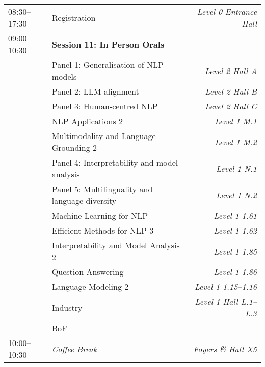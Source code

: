 \begin{xltabular}{\linewidth}{l X r}
    08:30--17:30    &   Registration    &   \textit{Level 0 Entrance Hall} \\
    09:00--10:30    &   \textbf{Session 11: In Person Orals} & \\
    &   Panel 1: Generalisation of NLP models   &   \textit{Level 2 Hall A} \\
    &   Panel 2: LLM alignment  &   \textit{Level 2 Hall B} \\
    &   Panel 3: Human-centred NLP  &   \textit{Level 2 Hall C} \\
    &   NLP Applications 2  &   \textit{Level 1 M.1} \\
    &   Multimodality and Language Grounding 2 &   \textit{Level 1 M.2} \\
    &   Panel 4: Interpretability and model analysis  &   \textit{Level 1 N.1} \\
    &   Panel 5: Multilinguality and language diversity  &   \textit{Level 1 N.2} \\
    &   Machine Learning for NLP  &   \textit{Level 1 1.61} \\
    &   Efficient Methods for NLP 3  &   \textit{Level 1 1.62} \\
    &   Interpretability and Model Analysis 2   &   \textit{Level 1 1.85} \\
    &   Question Answering   &   \textit{Level 1 1.86} \\
    &   Language Modeling 2   &   \textit{Level 1 1.15--1.16} \\
    &   Industry   &   \textit{Level 1 Hall L.1--L.3} \\
    &   BoF &   \\

    10:00--10:30    &   \textit{Coffee Break}    & \textit{Foyers \& Hall X5}  \\


\end{xltabular}
